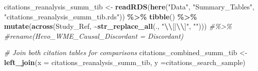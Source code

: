 \documentclass[
]{article}
\newenvironment{Shaded}{\begin{snugshade}}{\end{snugshade}}
\newcommand{\AttributeTok}[1]{\textcolor[rgb]{0.13,0.29,0.53}{#1}}
\newcommand{\CommentTok}[1]{\textcolor[rgb]{0.56,0.35,0.01}{\textit{#1}}}
\newcommand{\FunctionTok}[1]{\textcolor[rgb]{0.13,0.29,0.53}{\textbf{#1}}}
\newcommand{\NormalTok}[1]{#1}
\newcommand{\OtherTok}[1]{\textcolor[rgb]{0.56,0.35,0.01}{#1}}
\newcommand{\SpecialCharTok}[1]{\textcolor[rgb]{0.81,0.36,0.00}{\textbf{#1}}}
\newcommand{\StringTok}[1]{\textcolor[rgb]{0.31,0.60,0.02}{#1}}
\begin{document}
\begin{Shaded}
\begin{Highlighting}[]
\NormalTok{citations\_reanalysis\_summ\_tib }\OtherTok{\textless{}{-}} \FunctionTok{readRDS}\NormalTok{(}\FunctionTok{here}\NormalTok{(}\StringTok{"Data"}\NormalTok{, }\StringTok{"Summary\_Tables"}\NormalTok{, }\StringTok{"citations\_reanalysis\_summ\_tib.rds"}\NormalTok{)) }\SpecialCharTok{\%\textgreater{}\%} 
  \FunctionTok{tibble}\NormalTok{() }\SpecialCharTok{\%\textgreater{}\%} 
  \FunctionTok{mutate}\NormalTok{(}\FunctionTok{across}\NormalTok{(Study\_Ref, }\SpecialCharTok{\textasciitilde{}}\FunctionTok{str\_replace\_all}\NormalTok{(., }\StringTok{"}\SpecialCharTok{\textbackslash{}\textbackslash{}}\StringTok{[|}\SpecialCharTok{\textbackslash{}\textbackslash{}}\StringTok{]"}\NormalTok{, }\StringTok{""}\NormalTok{))) }\CommentTok{\#\%\textgreater{}\% }
  \CommentTok{\#rename(Hevo\_WME\_Causal\_Discordant = Discordant)}

\CommentTok{\# Join both citation tables for comparisons}
\NormalTok{citations\_combined\_summ\_tib }\OtherTok{\textless{}{-}} \FunctionTok{left\_join}\NormalTok{(}\AttributeTok{x =}\NormalTok{ citations\_reanalysis\_summ\_tib, }\AttributeTok{y =}\NormalTok{citations\_search\_sample)}


\end{Highlighting}
\end{Shaded}
\end{document}
